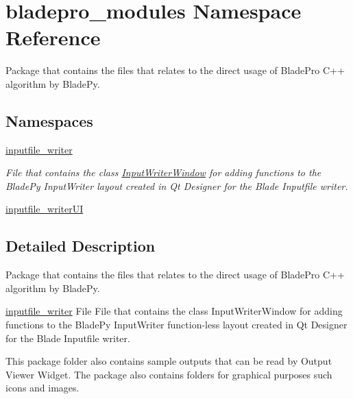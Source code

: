 \hypertarget{namespacebladepro__modules}{}\section{bladepro\+\_\+modules Namespace Reference}
\label{namespacebladepro__modules}


Package that contains the files that relates to the direct usage of Blade\+Pro C++ algorithm by Blade\+Py.  


\subsection*{Namespaces}
\begin{DoxyCompactItemize}
\item 
 \hyperlink{namespacebladepro__modules_1_1inputfile__writer}{inputfile\+\_\+writer}
\begin{DoxyCompactList}\small\item\em File that contains the class \hyperlink{classbladepro__modules_1_1inputfile__writer_1_1_input_writer_window}{Input\+Writer\+Window} for adding functions to the Blade\+Py Input\+Writer layout created in Qt Designer for the Blade Inputfile writer. \end{DoxyCompactList}\item 
 \hyperlink{namespacebladepro__modules_1_1inputfile__writer_u_i}{inputfile\+\_\+writer\+UI}
\end{DoxyCompactItemize}


\subsection{Detailed Description}
Package that contains the files that relates to the direct usage of Blade\+Pro C++ algorithm by Blade\+Py. 

\begin{DoxyItemize}
\item {\ttfamily \hyperlink{namespacebladepro__modules_1_1inputfile__writer}{inputfile\+\_\+writer}} File File that contains the class Input\+Writer\+Window for adding functions to the Blade\+Py Input\+Writer function-\/less layout created in Qt Designer for the Blade Inputfile writer.\end{DoxyItemize}
This package folder also contains sample outputs that can be read by Output Viewer Widget. The package also contains folders for graphical purposes such icons and images. 